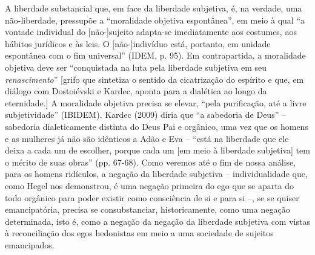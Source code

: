 A liberdade substancial que, em face da liberdade subjetiva, é, na
verdade, uma não-liberdade, pressupõe a ``moralidade objetiva
espontânea'', em meio à qual ``a vontade individual do {[}não-{]}sujeito
adapta-se imediatamente aos costumes, aos hábitos jurídicos e às leis. O
{[}não-{]}indivíduo está, portanto, em unidade espontânea com o fim
universal'' (IDEM, p. 95). Em contrapartida, a moralidade objetiva deve
ser ``conquistada na luta pela liberdade subjetiva em seu
\emph{renascimento}'' {[}grifo que sintetiza o sentido da cicatrização
do espírito e que, em diálogo com Dostoiévski e Kardec, aponta para a
dialética ao longo da eternidade.{]} A moralidade objetiva precisa se
elevar, ``pela purificação, até a livre subjetividade'' (IBIDEM). Kardec
(2009) diria que ``a sabedoria de Deus'' -- sabedoria dialeticamente
distinta do Deus Pai e orgânico, uma vez que os homens e as mulheres já
não são idênticos a Adão e Eva -- ``está na liberdade que ele deixa a
cada um de escolher, porque cada um {[}em meio à liberdade subjetiva{]}
tem o mérito de suas obras'' (pp. 67-68). Como veremos até o fim de
nossa análise, para os homens ridículos, a negação da liberdade
subjetiva -- individualidade que, como Hegel nos demonstrou, é uma
negação primeira do ego que se aparta do todo orgânico para poder
existir como consciência de si e para si --, se se quiser emancipatória,
precisa se consubstanciar, historicamente, como uma negação determinada,
isto é, como a negação da negação da liberdade subjetiva com vistas à
reconciliação dos egos hedonistas em meio a uma sociedade de sujeitos
emancipados.

